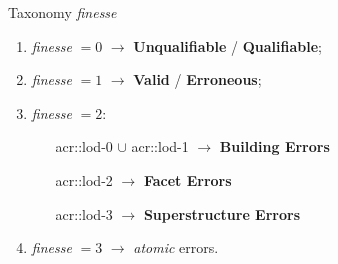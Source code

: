 \documentclass[export]{beamer}
\begin{document}
            \begin{frame}{Taxonomy \emph{finesse}}
                \begin{enumerate}[label = (\roman*)., font=\color{IGNGreen}]
                    \item<1-> \emph{finesse} $= 0$ $\longrightarrow$ \textbf{Unqualifiable} / \textbf{Qualifiable};
                    \item<2-> \emph{finesse} $= 1$ $\longrightarrow$ \textbf{Valid} / \textbf{Erroneous};
                    \item<3-> \emph{finesse} $= 2$:
                    \begin{itemize}[leftmargin=12em, font=\color{IGNDarkOrange}]
                        \item[\acrshort{acr::lod}-0 $\cup$ \acrshort{acr::lod}-1 $\longrightarrow$] \textbf{Building Errors}
                        \item[\acrshort{acr::lod}-2 $\longrightarrow$] \textbf{Facet Errors}
                        \item[\acrshort{acr::lod}-3 $\longrightarrow$] \textbf{Superstructure Errors}
                    \end{itemize}
                    \begin{figure}[H]
                        \begin{center}
                            
                        \end{center}
                    \end{figure}
                    \item<4-> \emph{finesse} $= 3$ $\longrightarrow$ \emph{atomic} errors.
                \end{enumerate}
            \end{frame}
\end{document}
